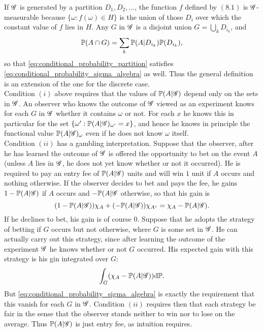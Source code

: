 If $\mathcal{G}$ is generated by a partition $D_1, D_2, \dots$, the function $f$ defined by $(8.1)$ is $\mathcal{G}$-measurable because $\{ \omega: f(\omega) \in H \}$ is the union of those $D_i$ over which the constant value of $f$ lies in $H$. Any $G$ in $\mathcal{G}$ is a disjoint union $G = \bigcup_{k} D_{i_k}$, and 
\begin{equation}
    \mathbb{P}(A \cap G) = \sum_k \mathbb{P}(A | D_{i_k})\mathbb{P}(D_{i_k}),
\end{equation}
so that \eqref{eq:conditional_probability_partition} satisfies \eqref{eq:conditional_probability_sigma_algebra} as well. Thus the general definition is an extension of the one for the discrete case.\\

Condition $(i)$ above requires that the values of $\mathbb{P}(A|\mathcal{G})$ depend only on the sets in $\mathcal{G}$. An observer who knows the outcome of $\mathcal{G}$ viewed as an experiment knows for each $G$ in $\mathcal{G}$ whether it contains $\omega$ or not. For each $x$ he knows this in particular for the set $\{\omega' : \mathbb{P}(A|\mathcal{G})_{\omega'} = x\}$, and hence he knows in principle the functional value $\mathbb{P}(A|\mathcal{G})_\omega$ even if he does not know $\omega$ itself.\\

Condition $(ii)$ has a gambling interpretation. Suppose that the observer, after he has learned the outcome of $\mathcal{G}$ is offered the opportunity to bet on the event $A$ (unless $A$ lies in $\mathcal{G}$, he does not yet know whether or not it occurred). He is required to pay an entry fee of $\mathbb{P}(A|\mathcal{G})$ units and will win $1$ unit if $A$ occurs and nothing otherwise. If the observer decides to bet and pays the fee, he gains $1 - \mathbb{P}(A|\mathcal{G})$ if $A$ occurs and $-\mathbb{P}(A | \mathcal{G}$ otherwise, so that his gain is 
\begin{equation*}
    (1 - \mathbb{P}(A | \mathcal{G})) \chi_A + (-\mathbb{P}(A|\mathcal{G}))\chi_{A^c} = \chi_A - \mathbb{P}(A | \mathcal{G}).
\end{equation*}
If he declines to bet, his gain is of course $0$. Suppose that he adopts the strategy of betting if $G$ occurs but not otherwise, where $G$ is some set in $\mathcal{G}$. He can actually carry out this strategy, since after learning the outcome of the experiment $\mathcal{G}$ he knows whether or not $G$ occurred. His expected gain with this strategy is his gin integrated over $G$:
\begin{equation*}
    \int_G (\chi_A - \mathbb{P}(A | \mathcal{G})) \mathrm{d} \mathbb{P}.
\end{equation*}
But \eqref{eq:conditional_probability_sigma_algebra} is exactly the requirement that this vanish for each $G$ in $\mathcal{G}$. Condition $(ii)$ requires then that each strategy be fair in the sense that the observer stands neither to win nor to lose on the average. Thus $\mathbb{P}(A | \mathcal{G})$ is just entry fee, as intuition requires.\\


